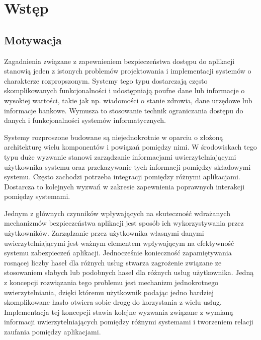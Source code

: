 \chapter{Wstęp}
\label{cha:wstep}


\section{Motywacja}
\label{sec:motywacja}

Zagadnienia związane z zapewnieniem bezpieczeństwa dostępu do aplikacji stanowią jeden z istonych problemów projektowania i implementacji systemów o charakterze rozpropszonym. Systemy tego typu dostarczają często skomplikowanych funkcjonalności i udostępniają poufne dane lub informacje o wysokiej wartości, takie jak np. wiadomości o stanie zdrowia, dane urzędowe lub informacje bankowe. Wymusza to stosowanie technik ograniczania dostępu do danych i funkcjonalności systemów informatycznych.

Systemy rozproszone budowane są niejednokrotnie w oparciu o złożoną architekturę wielu komponentów i powiązań pomiędzy nimi. W środowiskach tego typu duże wyzwanie stanowi zarządzanie informacjami uwierzytelniającymi użytkownika systemu oraz przekazywanie tych informacji pomiędzy składowymi systemu. Często zachodzi potrzeba integracji pomiędzy różnymi aplikacjami. Dostarcza to kolejnych wyzwań w zakresie zapewnienia poprawnych interakcji pomiędzy systemami.

Jednym z głównych czynników wpływających na skuteczność wdrażanych mechanizmów bezpieczeństwa aplikacji jest sposób ich wykorzystywania przez użytkowników. Zarządzanie przez użytkownika własnymi danymi uwierzytelniającymi jest ważnym elementem wpływającym na efektywność systemu zabezpieczeń aplikacji. Jednocześnie konieczność zapamiętywania rosnącej liczby haseł dla różnych usług stwarza zagrożenie związane ze stosowaniem słabych lub podobnych haseł dla różnych usług użytkownika. Jedną z koncepcji rozwiązania tego problemu jest mechanizm jednokrotnego uwierzytelniania, dzięki któremu użytkownik podając jedno bardziej skomplikowane hasło otwiera sobie drogę do korzystania z wielu usług. Implementacja tej koncepcji stawia kolejne wyzwania związane z wymianą informacji uwierzytelniających pomiędzy różnymi systemami i tworzeniem relacji zaufania pomiędzy  aplikacjami.


